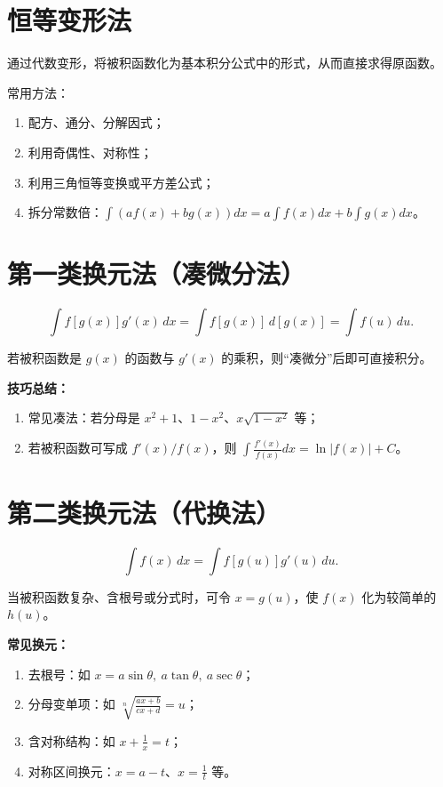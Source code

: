 
\section{恒等变形法}

通过代数变形，将被积函数化为基本积分公式中的形式，从而直接求得原函数。

常用方法：
\begin{enumerate}
    \item 配方、通分、分解因式；
    \item 利用奇偶性、对称性；
    \item 利用三角恒等变换或平方差公式；
    \item 拆分常数倍：$\displaystyle \int (a f(x) + b g(x))dx = a\int f(x)dx + b\int g(x)dx$。
\end{enumerate}

\section{第一类换元法（凑微分法）}

\[
    \int f[g(x)]g'(x)\,dx = \int f[g(x)]\,d[g(x)] = \int f(u)\,du.
\]

若被积函数是 $g(x)$ 的函数与 $g'(x)$ 的乘积，则“凑微分”后即可直接积分。

\textbf{技巧总结：}
\begin{enumerate}
    \item 常见凑法：若分母是 $x^2+1$、$1-x^2$、$x\sqrt{1-x^2}$ 等；
    \item 若被积函数可写成 $f'(x)/f(x)$，则 $\displaystyle \int \frac{f'(x)}{f(x)}dx = \ln|f(x)| + C$。
\end{enumerate}

\section{第二类换元法（代换法）}

\[
    \int f(x)\,dx = \int f[g(u)]g'(u)\,du.
\]

当被积函数复杂、含根号或分式时，可令 $x=g(u)$，使 $f(x)$ 化为较简单的 $h(u)$。

\textbf{常见换元：}
\begin{enumerate}
    \item 去根号：如 $x=a\sin\theta,\ a\tan\theta,\ a\sec\theta$；
    \item 分母变单项：如 $\sqrt[n]{\frac{ax+b}{cx+d}} = u$；
    \item 含对称结构：如 $x+\frac{1}{x}=t$；
    \item 对称区间换元：$x=a-t$、$x=\frac{1}{t}$ 等。
\end{enumerate}

